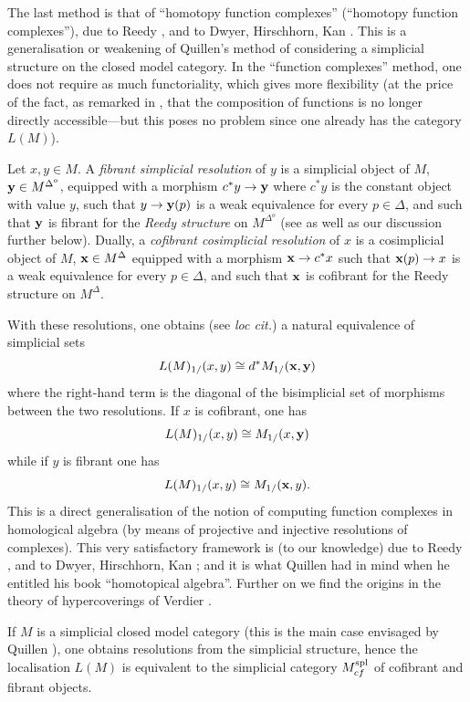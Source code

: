 The last method is that of ``homotopy function complexes''
(``homotopy function complexes''), due to Reedy \cite{Reedy}, and to Dwyer,
Hirschhorn, Kan \cite{DHK} \cite{Hirschhorn} \cite{DwyerKan3}. This is a
generalisation or weakening of Quillen's method \cite{Quillen}
of considering a simplicial structure on the closed model
category.
In the ``function complexes'' method,
one does not require as much functoriality, which gives
more flexibility (at the price of the fact, as remarked in \cite{DHK}, that the
composition of functions is no longer directly accessible---but this poses
no problem since one already has the category $L(M)$).

Let $x,y\in M$. A {\em fibrant simplicial resolution} of $y$ is a simplicial
object of $M$, ${\bf y}\in M^{\Delta ^o}$, equipped with a morphism
$c^{\ast}y\rightarrow {\bf y}$ where $c^{\ast} y$ is the constant object with
value $y$, such that $y\rightarrow {\bf y}(p)$ is a weak
equivalence for every $p\in \Delta$, and such that ${\bf y}$ is fibrant for the
{\em
Reedy structure} on $M^{\Delta ^o}$ (see \cite{Reedy} \cite{Hirschhorn}
\cite{DHK} \cite{JardineGoerssBook} as well as our discussion further below).
Dually, a {\em cofibrant cosimplicial resolution} of $x$ is a
cosimplicial object of $M$, ${\bf x}\in M^{\Delta}$ equipped with a
morphism ${\bf x}\rightarrow
c^{\ast}x$ such that ${\bf x}(p)\rightarrow x$ is a weak equivalence for
every $p\in \Delta$, and such that ${\bf x}$ is cofibrant for the
Reedy structure on $M^{\Delta}$.

With these resolutions, one obtains (see {\em loc cit.}) a
natural equivalence of simplicial sets
$$
L(M)_{1/}(x,y) \cong d^{\ast} M_{1/}({\bf x}, {\bf y})
$$
where the right-hand term is the diagonal of the bisimplicial set of
morphisms between the two resolutions. If $x$ is cofibrant, one has
$$
L(M)_{1/}(x,y)\cong M_{1/}(x, {\bf y})
$$
while if $y$ is fibrant one has
$$
L(M)_{1/}(x,y)\cong M_{1/}({\bf x}, y).
$$
This is a direct generalisation of the notion of
computing function complexes in homological algebra (by means of
projective and injective resolutions of complexes). This very satisfactory
framework is (to
our knowledge) due to Reedy \cite{Reedy}, and to Dwyer,
Hirschhorn, Kan \cite{DHK} \cite{Hirschhorn} \cite{DwyerKan3}; and it is what
Quillen had in mind when he entitled his book
\cite{Quillen} ``homotopical algebra''. Further on we find the origins in the
theory of
hypercoverings of Verdier \cite{SGA4b}.

If $M$ is a
simplicial closed model category (this is the main case
envisaged by Quillen \cite{Quillen}), one obtains
resolutions from the simplicial structure, hence the localisation
$L(M)$ is
equivalent to
the simplicial category $M^{\rm spl}_{cf}$ of cofibrant
and fibrant objects.

